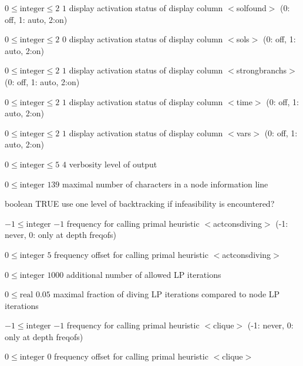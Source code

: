 %
{$0\leq\textrm{integer}\leq2$}%
{$1$}%
{display activation status of display column $<$solfound$>$ (0: off, 1: auto, 2:on)}%
{}

%
{$0\leq\textrm{integer}\leq2$}%
{$0$}%
{display activation status of display column $<$sols$>$ (0: off, 1: auto, 2:on)}%
{}

%
{$0\leq\textrm{integer}\leq2$}%
{$1$}%
{display activation status of display column $<$strongbranchs$>$ (0: off, 1: auto, 2:on)}%
{}

%
{$0\leq\textrm{integer}\leq2$}%
{$1$}%
{display activation status of display column $<$time$>$ (0: off, 1: auto, 2:on)}%
{}

%
{$0\leq\textrm{integer}\leq2$}%
{$1$}%
{display activation status of display column $<$vars$>$ (0: off, 1: auto, 2:on)}%
{}

%
{$0\leq\textrm{integer}\leq5$}%
{$4$}%
{verbosity level of output}%
{}

%
{$0\leq\textrm{integer}$}%
{$139$}%
{maximal number of characters in a node information line}%
{}

%
{boolean}%
{TRUE}%
{use one level of backtracking if infeasibility is encountered?}%
{}

%
{$-1\leq\textrm{integer}$}%
{$-1$}%
{frequency for calling primal heuristic $<$actconsdiving$>$ (-1: never, 0: only at depth freqofs)}%
{}

%
{$0\leq\textrm{integer}$}%
{$5$}%
{frequency offset for calling primal heuristic $<$actconsdiving$>$}%
{}

%
{$0\leq\textrm{integer}$}%
{$1000$}%
{additional number of allowed LP iterations}%
{}

%
{$0\leq\textrm{real}$}%
{$0.05$}%
{maximal fraction of diving LP iterations compared to node LP iterations}%
{}

%
{$-1\leq\textrm{integer}$}%
{$-1$}%
{frequency for calling primal heuristic $<$clique$>$ (-1: never, 0: only at depth freqofs)}%
{}

%
{$0\leq\textrm{integer}$}%
{$0$}%
{frequency offset for calling primal heuristic $<$clique$>$}%
{}

